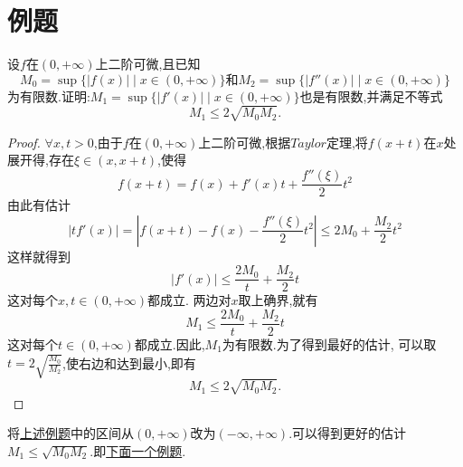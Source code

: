 \documentclass[lang=cn,newtx,10pt,scheme=chinese]{../Template/elegantbook}
\begin{document}
\section{例题}

\begin{example}\label{example:1.1(由原函数和二阶导数上确界估计一阶导数上确界)}
    设\(f\)在\((0,+\infty)\)上二阶可微,且已知
    \begin{equation}
    M_0=\sup\{\vert f(x)\vert\mid x\in(0,+\infty)\}\text{和}M_2=\sup\{\vert f''(x)\vert\mid x\in(0,+\infty)\}
        \nonumber
    \end{equation}
    为有限数.证明:\(M_1=\sup\{\vert f'(x)\vert\mid x\in(0,+\infty)\}\)也是有限数,并满足不等式
    \begin{equation}
        M_1\leqslant 2\sqrt{M_0M_2}.
        \nonumber
    \end{equation}
        \begin{proof}
        $\forall x,t>0$,由于$f$在$(0,+\infty)$上二阶可微,根据$Taylor$定理,将$f(x+t)$在$x$处展开得,存在$\xi\in(x,x+t)$,使得
        \begin{equation}
    f(x+t)=f(x)+f'(x)t+\frac{f''(\xi)}{2}t^2
    \nonumber
        \end{equation}
        由此有估计
        \begin{equation}
        |tf'(x)|=|f(x+t)-f(x)-\frac{f''(\xi)}{2}t^2|\leqslant2M_0+\frac{M_2}{2}t^2
            \nonumber
        \end{equation}
        这样就得到
        \begin{equation}
    |f'(x)|\leqslant\frac{2M_0}{t}+\frac{M_2}{2}t
            \nonumber
        \end{equation}
        这对每个$x,t\in(0,+\infty)$都成立.
        两边对$x$取上确界,就有
        \begin{equation}
            M_1\leqslant\frac{2M_0}{t}+\frac{M_2}{2}t
            \nonumber
        \end{equation}
        这对每个$t\in(0,+\infty)$都成立.因此,$M_1$为有限数.为了得到最好的估计,
        可以取$t=2\sqrt{\frac{M_0}{M_2}}$,使右边和达到最小,即有
        \begin{equation}
            M_1\leqslant2\sqrt{M_0M_2}.
            \nonumber
        \end{equation}
        
\end{proof}
\end{example}
\begin{remark}
    将\hyperref[example:1.1(由原函数和二阶导数上确界估计一阶导数上确界)]{上述例题}中的区间从$(0,+\infty)$改为$(-\infty,+\infty)$.可以得到更好的估计$M_1\leqslant \sqrt{M_0M_2}$.即\hyperref[example:1.1(由原函数和二阶导数上确界估计一阶导数上确界)(区间为R)]{下面一个例题}.
\end{remark}
\end{document}
